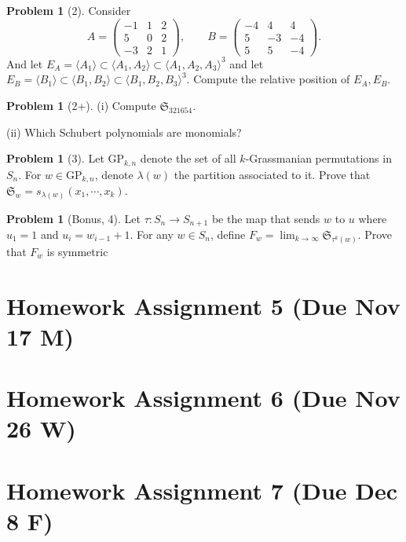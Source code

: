 \documentclass{amsart}
\theoremstyle{plain}
\theoremstyle{definition}
\newtheorem{problem}[theorem]{Problem}
\begin{document}
\begin{problem}[2]Consider
\[
A = \begin{pmatrix}
-1 & 1 & 2 \\
5 & 0 & 2 \\
-3 & 2 & 1
\end{pmatrix},
\qquad
B = \begin{pmatrix}
-4 & 4 & 4 \\
5 & -3 & -4 \\
5 & 5 & -4
\end{pmatrix}.
\]
And let $E_A=\langle A_1\rangle \subset \langle A_1,A_2\rangle\subset \langle A_1,A_2,A_3\rangle ^3 $ and let $E_B=\langle B_1\rangle \subset \langle B_1,B_2\rangle\subset \langle B_1,B_2,B_3\rangle ^3 $. Compute the relative position of $E_A,E_B$.

\end{problem}

\begin{problem}[2+]
	(i) Compute $\mathfrak{S}_{321654}$.
	
	(ii) Which Schubert polynomials are monomials?
\end{problem}
\begin{problem}[3]
	Let $\text{GP}_{k,n}$ denote the set of all $k$-Grassmanian permutations in $S_n$. For $w\in \text{GP}_{k,n}$, denote $\lambda(w)$ the partition associated to it. Prove that $\mathfrak{S}_w=s_{\lambda(w)}(x_1,\cdots,x_k)$.\end{problem}
\begin{problem}[Bonus, 4]
	Let $\tau:S_n\to S_{n+1}$ be the map that sends $w$ to $u$  where $u_1=1$ and $u_{i}=w_{i-1}+1$. For any $w\in S_n$, define $F_w=\lim_{k\to\infty}\mathfrak{S}_{\tau^k(w)}$. Prove that $F_w$ is symmetric
\end{problem}
	\section{Homework Assignment 5 (Due Nov 17 M)}
	\section{Homework Assignment 6 (Due Nov 26 W)}
	\section{Homework Assignment 7 (Due Dec 8 F)}


	
	
	
	
	
	
	
	
\end{document}

